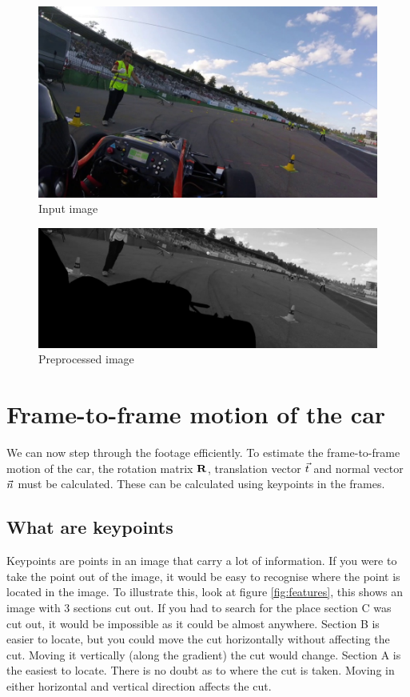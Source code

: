 \begin{figure}
    \centering
    \includegraphics[width=1\textwidth]{figures/input_image.jpg}
    \caption{Input image}
    \label{fig:input_image}
\end{figure}

\begin{figure}
    \centering
    \includegraphics[width=1\textwidth]{figures/output_image.jpg}
    \caption{Preprocessed image}
    \label{fig:output_image}
\end{figure}

\section{Frame-to-frame motion of the car}
We can now step through the footage efficiently. To estimate the frame-to-frame motion of the car, the rotation matrix $\mathbf{R}$, translation vector $\vec t$ and normal vector $\vec n$ must be calculated. These can be calculated using keypoints in the frames. 

\subsection{What are keypoints}
Keypoints are points in an image that carry a lot of information. If you were to take the point out of the image, it would be easy to recognise where the point is located in the image. To illustrate this, look at figure \autoref{fig:features}, this shows an image with 3 sections cut out. If you had to search for the place section C was cut out, it would be impossible as it could be almost anywhere. Section B is easier to locate, but you could move the cut horizontally without affecting the cut. Moving it vertically (along the gradient) the cut would change. Section A is the easiest to locate. There is no doubt as to where the cut is taken. Moving in either horizontal and vertical direction affects the cut.\bigskip

